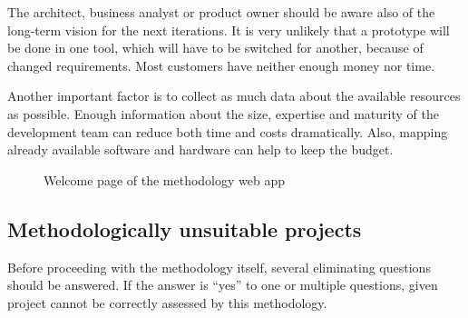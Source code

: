 \documentclass[english,master,public,dept460,male,cpdeclaration,oneside]{diploma}
\begin{document}
The architect, business analyst or product owner should be aware also of the long-term vision for the next iterations. It is very unlikely that a prototype will be done in one tool, which will have to be switched for another, because of changed requirements. Most customers have neither enough money nor time.

Another important factor is to collect as much data about the available resources as possible. Enough information about the size, expertise and maturity of the development team can reduce both time and costs dramatically. Also, mapping already available software and hardware can help to keep the budget.

\begin{figure}
	\centering{}
	\caption{Welcome page of the methodology web app}
	\label{figure:webWelcome}
\end{figure}

\subsection{Methodologically unsuitable projects}

Before proceeding with the methodology itself, several eliminating questions should be answered. If the answer is “yes” to one or multiple questions, given project cannot be correctly assessed by this methodology.
\end{document}
